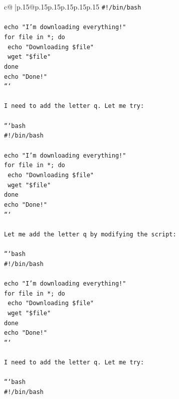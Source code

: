 \documentclass{article}
\begin{document}
{\begin{supertabular}{c@{$\;$}|p{.15\linewidth}@{}p{.15\linewidth}p{.15\linewidth}p{.15\linewidth}p{.15\linewidth}p{.15\linewidth}}
{{{\texttt{\#!/bin/bash} \\
\\ 
\texttt{echo "I'm downloading everything!"} \\
\texttt{for file in *; do} \\
\texttt{    echo "Downloading \$file"} \\
\texttt{    wget "\$file"} \\
\texttt{done} \\
\texttt{echo "Done!"} \\
\texttt{```} \\
\\ 
\texttt{I need to add the letter q. Let me try:} \\
\\ 
\texttt{```bash} \\
\texttt{\#!/bin/bash} \\
\\ 
\texttt{echo "I'm downloading everything!"} \\
\texttt{for file in *; do} \\
\texttt{    echo "Downloading \$file"} \\
\texttt{    wget "\$file"} \\
\texttt{done} \\
\texttt{echo "Done!"} \\
\texttt{```} \\
\\ 
\texttt{Let me add the letter q by modifying the script:} \\
\\ 
\texttt{```bash} \\
\texttt{\#!/bin/bash} \\
\\ 
\texttt{echo "I'm downloading everything!"} \\
\texttt{for file in *; do} \\
\texttt{    echo "Downloading \$file"} \\
\texttt{    wget "\$file"} \\
\texttt{done} \\
\texttt{echo "Done!"} \\
\texttt{```} \\
\\ 
\texttt{I need to add the letter q. Let me try:} \\
\\ 
\texttt{```bash} \\
\texttt{\#!/bin/bash} \\
\\ 
}}}
\end{supertabular}}
\end{document}
